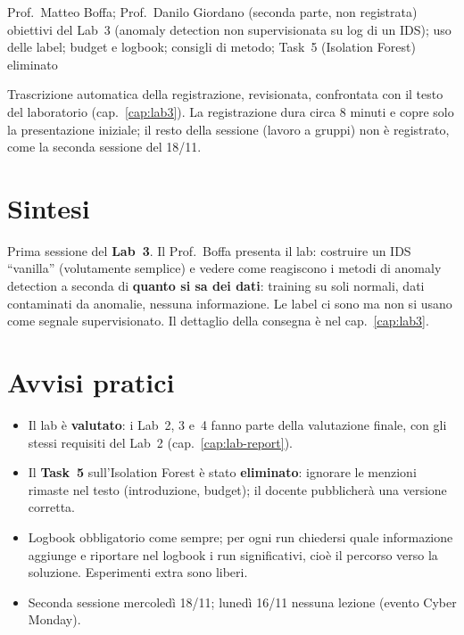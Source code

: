   {Prof.~Matteo Boffa; Prof.~Danilo Giordano (seconda parte, non registrata)}
  {obiettivi del Lab~3 (anomaly detection non supervisionata su log di un IDS); uso delle label; budget e
   logbook; consigli di metodo; Task~5 (Isolation Forest) eliminato}
\label{lez:2026-11-11}

\begin{nota}[Fonte]
Trascrizione automatica della registrazione, revisionata, confrontata con il testo del laboratorio
(cap.~\ref{cap:lab3}). La registrazione dura circa 8 minuti e copre solo la presentazione iniziale; il
resto della sessione (lavoro a gruppi) non è registrato, come la seconda sessione del 18/11.
\end{nota}

\section{Sintesi}
Prima sessione del \textbf{Lab~3}. Il Prof.~Boffa presenta il lab: costruire un IDS ``vanilla'' (volutamente
semplice) e vedere come reagiscono i metodi di anomaly detection a seconda di \textbf{quanto si sa dei dati}:
training su soli normali, dati contaminati da anomalie, nessuna informazione. Le label ci sono ma non si usano
come segnale supervisionato. Il dettaglio della consegna è nel cap.~\ref{cap:lab3}.

\section{Avvisi pratici}
\begin{itemize}
  \item Il lab è \textbf{valutato}: i Lab~2, 3 e~4 fanno parte della valutazione finale, con gli stessi
        requisiti del Lab~2 (cap.~\ref{cap:lab-report}).
  \item Il \textbf{Task~5} sull'Isolation Forest è stato \textbf{eliminato}: ignorare le menzioni rimaste nel
        testo (introduzione, budget); il docente pubblicherà una versione corretta.
  \item Logbook obbligatorio come sempre; per ogni run chiedersi quale informazione aggiunge e riportare nel
        logbook i run significativi, cioè il percorso verso la soluzione. Esperimenti extra sono liberi.
  \item Seconda sessione mercoledì 18/11; lunedì 16/11 nessuna lezione (evento Cyber Monday).
\end{itemize}

